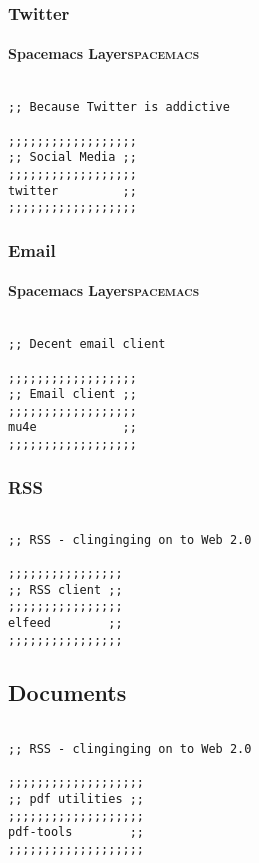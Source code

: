 \documentclass[11pt]{article}
\begin{document}
\subsubsection{Twitter}
\label{sec:orgdd56533}

\paragraph{Spacemacs Layer\hfill{}\textsc{spacemacs}}
\label{sec:org42a7a67}
\begin{verbatim}

;; Because Twitter is addictive

;;;;;;;;;;;;;;;;;;
;; Social Media ;;
;;;;;;;;;;;;;;;;;;
twitter         ;;
;;;;;;;;;;;;;;;;;;
\end{verbatim}

\subsubsection{Email}
\label{sec:org21a82c6}

\paragraph{Spacemacs Layer\hfill{}\textsc{spacemacs}}
\label{sec:orge3e56e6}
\begin{verbatim}

;; Decent email client

;;;;;;;;;;;;;;;;;;
;; Email client ;;
;;;;;;;;;;;;;;;;;;
mu4e            ;;
;;;;;;;;;;;;;;;;;;
\end{verbatim}

\subsubsection{RSS}
\label{sec:org1931cf8}
\begin{verbatim}

;; RSS - clinginging on to Web 2.0

;;;;;;;;;;;;;;;;
;; RSS client ;;
;;;;;;;;;;;;;;;;
elfeed        ;;
;;;;;;;;;;;;;;;;
\end{verbatim}

\subsection{Documents}
\label{sec:org09dd4c8}

\begin{verbatim}

;; RSS - clinginging on to Web 2.0

;;;;;;;;;;;;;;;;;;;
;; pdf utilities ;;
;;;;;;;;;;;;;;;;;;;
pdf-tools        ;;
;;;;;;;;;;;;;;;;;;;
\end{verbatim}
\end{document}
